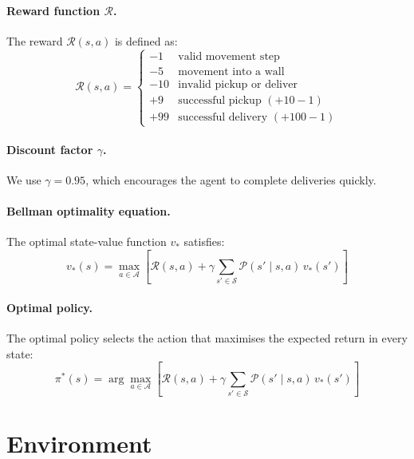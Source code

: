 \documentclass[a4paper,11pt]{article}
\newcommand{\states}{\ensuremath{\mathcal{S}}} %
\newcommand{\actions}{\ensuremath{\mathcal{A}}} %
\newcommand{\policy}{\ensuremath{\pi}} %
\newcommand{\optsval}{\ensuremath{v_*}} %
\newcommand{\reward}{\ensuremath{\mathcal{R}}} %
\newcommand{\transition}{\ensuremath{\mathcal{P}}} %
\newcommand{\discount}{\ensuremath{\gamma}} %
\theoremstyle{definition}
\begin{document}
\paragraph{Reward function $\reward$.}
The reward $\reward(s, a)$ is defined as:
\begin{equation}
    \reward(s, a) =
    \begin{cases}
        -1   & \text{valid movement step} \\
        -5   & \text{movement into a wall} \\
        -10  & \text{invalid pickup or deliver} \\
        +9   & \text{successful pickup } (+10 - 1) \\
        +99  & \text{successful delivery } (+100 - 1)
    \end{cases}
\end{equation}

\paragraph{Discount factor $\discount$.}
We use $\discount = 0.95$, which encourages the agent to complete deliveries quickly.

\paragraph{Bellman optimality equation.}
The optimal state-value function $\optsval$ satisfies:
\begin{equation}
    \optsval(s) = \max_{a \in \actions} \left[ \reward(s,a) + \discount \sum_{s' \in \states} \transition(s' \mid s, a)\, \optsval(s') \right]
\end{equation}

\paragraph{Optimal policy.}
The optimal policy selects the action that maximises the expected return in every state:
\begin{equation}
    \policy^*(s) = \arg\max_{a \in \actions} \left[ \reward(s,a) + \discount \sum_{s' \in \states} \transition(s' \mid s, a)\, \optsval(s') \right]
\end{equation}


\section{Environment}
\end{document}
